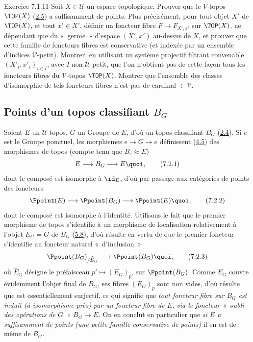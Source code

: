 \begin{enonce*}[remark]{Exercice 7.1.11}
Soit $X\in 𝒰$ un espace topologique. Prouver que le
$V$-topos $\TOP(X)$ (\hyperref[IV.subsec2.5]{2.5}) a suffisamment de points.
Plus précisément, pour tout objet $X'$ de $\TOP(X)$, et tout $x'\in
X'$, définir un foncteur fibre $F\mapsto F_{X',x'}$ sur $\TOP(X)$,
ne dépendant que du « germe » d'espace $(X',x')$ au-dessus de
$X$, et prouver que cette famille de foncteurs fibres est
conservative (et indexée par un ensemble d'indices
$𝒱$-petit). Montrer, en utilisant un système projectif
filtrant convenable $(X'_i,x'_i)_{i\in I}$, avec $I$ non
$𝒰$-petit, que l'on n'obtient pas de cette façon tous les
foncteurs fibres du $𝒱$-topos $\TOP(X)$. Montrer que
l'ensemble des classes d'isomorphie de tels foncteurs fibres n'est
pas de cardinal $\in 𝒱$.
\end{enonce*}

\subsection{Points d'un topos classifiant
  $B_G$}\pageoriginale

Soient $E$ un $𝒰$-topos, $G$ un Groupe de $E$, d'où un topos
classifiant $B_G$ (\hyperref[IV.subsec2.4]{2.4}). Si $e$ est le Groupe
ponctuel, les morphismes $e\rightarrow G\rightarrow e$ définissent
(\hyperref[IV.subsec4.5]{4.5}) des morphismes de topos (compte tenu que
$B_e\approx E$)
\begin{equation*}
E\longrightarrow B_G \longrightarrow E{\quoi},\tag{7.2.1}
\end{equation*}
dont le composé est isomorphe à $\id_E$, d'où par passage aux
catégories de points des foncteurs
\begin{equation*}
\Ppoint(E)\longrightarrow \Ppoint(B_G)\longrightarrow
\Ppoint(E){\quoi},\tag{7.2.2}
\end{equation*}
dont le composé est isomorphe à l'identité. Utilisons le fait que le
premier morphisme de topos  s'identifie à un morphisme
de localisation relativement à l'objet $E_G=G$ de $B_G$
(\hyperref[IV.subsec5.8]{5.8}), d'où résulte en vertu de  que le
premier foncteur  s'identifie au foncteur naturel « d'inclusion »
\begin{equation*}
\Ppoint(B_G)_{/\widehat{E}_G}\longrightarrow
\Ppoint(B_G){\quoi},\tag{7.2.3}
\end{equation*}
où $\widehat{E}_G$ désigne le préfaisceau $p'\mapsto (E_G)_{p'}$ sur
$\Ppoint(B_G)$. Comme $E_G$ couvre évidemment l'objet final de
$B_G$, ses fibres $(E_G)_p$ sont non vides, d'où résulte que
 est essentiellement surjectif, ce qui signifie que
\emph{tout foncteur fibre sur $B_G$ est induit (à isomorphisme près)
par un foncteur fibre de $E$, via le foncteur « oubli des
opérations de $G$ » $B_G\rightarrow E$.} On en conclut en
particulier que \emph{si $E$ a suffisamment de points (\resp une
petite famille conservative de points)} il en est de même de $B_G$.


